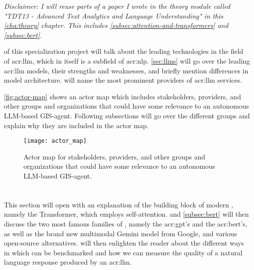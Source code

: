 \textit{Disclaimer: I will reuse parts of a paper I wrote in the theory module called "TDT13 - Advanced Text Analytics and Language Understanding" in this \autoref{cha:theory} chapter. This includes \autoref{subsec:attention-and-transformers} and \autoref{subsec:bert}.}

\vspace{12pt}

 of this specialization project will talk about the leading technologies in the field of \gls{acr:llm}, which in itself is a subfield of \gls{acr:nlp}. \autoref{sec:llms} will go over the leading \gls{acr:llm} models, their strengths and weaknesses, and briefly mention differences in model architecture.  will name the most prominent providers of \gls{acr:llm} services.

\autoref{fig:actor-map} shows an actor map which includes stakeholders, providers, and other groups and organizations that could have some relevance to an autonomous LLM-based GIS-agent. Following subsections will go over the different groups and explain why they are included in the actor map.

\begin{figure}
    \texttt{[image: actor\_map]}
    \caption{Actor map for stakeholders, providers, and other groups and organizations that could have some relevance to an autonomous LLM-based GIS-agent.}
    \label{fig:actor-map}
\end{figure}

\section[Large Language Models]{}\label{sec:llms}

This section will open with an explanation of the building block of modern , namely the Transformer, which employs self-attention.  and \autoref{subsec:bert} will then discuss the two most famous families of , namely the \acrshort{acr:gpt}'s and the \acrshort{acr:bert}'s, as well as the brand new multimodal Gemini model from Google, and various open-source alternatives.  will then enlighten the reader about the different ways in which  can be benchmarked and how we can measure the quality of a natural language response produced by an \acrshort{acr:llm}.

